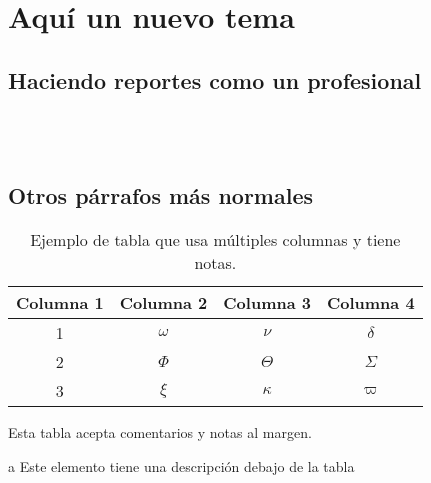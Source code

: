 \section{Aquí un nuevo tema}

\subsection{Haciendo reportes como un profesional}


	~ \lipsum[1] \\

	\lipsum[2] \\
	\lipsum[3]


	\lipsum[1]

\subsection{Otros párrafos más normales}

	\begin{table*}
		\begin{threeparttable}
		\centering
		\caption{Ejemplo de tabla que usa múltiples columnas y tiene notas.}
		\begin{tabular}{cccc}
			\hline
			\textbf{Columna 1} & \textbf{Columna 2} & \textbf{Columna 3} & \textbf{Columna 4} \bigstrut\\
			\hline
			1 & $\omega$ & $\nu$ & $\delta$ \tnote{a} \\
			2 & $\Phi$ & $\Theta$ & $\varSigma$ \\
			3 & $\xi$ & $\kappa$ & $\varpi$ \\
			\hline
		\end{tabular}
		\begin{tablenotes}
			Esta tabla acepta comentarios y notas al margen.
			\item[a] Este elemento tiene una descripción debajo de la tabla
		\end{tablenotes}
		\end{threeparttable}
	\end{table*}

